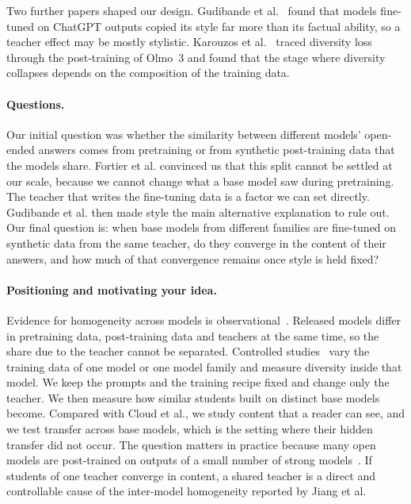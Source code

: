 \documentclass{article}
\begin{document}
Two further papers shaped our design. Gudibande et al.~\cite{gudibande2023false} found that models fine-tuned on ChatGPT outputs copied its style far more than its factual ability, so a teacher effect may be mostly stylistic. Karouzos et al.~\cite{karouzos2026collapse} traced diversity loss through the post-training of Olmo~3 and found that the stage where diversity collapses depends on the composition of the training data.

\paragraph{Questions.}
Our initial question was whether the similarity between different models' open-ended answers comes from pretraining or from synthetic post-training data that the models share. Fortier et al. convinced us that this split cannot be settled at our scale, because we cannot change what a base model saw during pretraining. The teacher that writes the fine-tuning data is a factor we can set directly. Gudibande et al. then made style the main alternative explanation to rule out. Our final question is: when base models from different families are fine-tuned on synthetic data from the same teacher, do they converge in the content of their answers, and how much of that convergence remains once style is held fixed?

\paragraph{Positioning and motivating your idea.}
Evidence for homogeneity across models is observational~\cite{jiang2025hivemind,lee2025quantification}. Released models differ in pretraining data, post-training data and teachers at the same time, so the share due to the teacher cannot be separated. Controlled studies~\cite{fortier2026convergence,karouzos2026collapse,schaffelder2025eggs} vary the training data of one model or one model family and measure diversity inside that model. We keep the prompts and the training recipe fixed and change only the teacher. We then measure how similar students built on distinct base models become. Compared with Cloud et al., we study content that a reader can see, and we test transfer across base models, which is the setting where their hidden transfer did not occur. The question matters in practice because many open models are post-trained on outputs of a small number of strong models~\cite{lee2025quantification}. If students of one teacher converge in content, a shared teacher is a direct and controllable cause of the inter-model homogeneity reported by Jiang et al.
\end{document}
